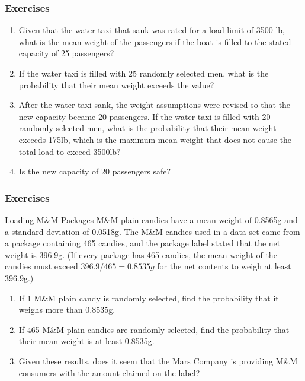 \documentclass[xcolor=dvipsnames]{beamer}
\begin{document}
\begin{frame}
  \frametitle{Exercises}
  \begin{enumerate}
  \item Given that the water taxi that sank was rated for a load
    limit of 3500 lb, what is the mean weight of the passengers if the
    boat is filled to the stated capacity of 25 passengers?
  \item If the water taxi is filled with 25 randomly selected men,
    what is the probability that their mean weight exceeds the value?
  \item After the water taxi sank, the weight assumptions were
    revised so that the new capacity became 20 passengers. If the
    water taxi is filled with 20 randomly selected men, what is the
    probability that their mean weight exceeds 175lb, which is the
    maximum mean weight that does not cause the total load to exceed
    3500lb?
  \item Is the new capacity of 20 passengers safe?
  \end{enumerate}
\end{frame}

\begin{frame}
  \frametitle{Exercises}
  {\ubung} Loading M\&M Packages M\&M plain candies have a mean weight
  of 0.8565g and a standard deviation of 0.0518g. The M\&M candies
  used in a data set came from a package containing 465 candies, and
  the package label stated that the net weight is 396.9g. (If every
  package has 465 candies, the mean weight of the candies must exceed
  $396.9/465=0.8535g$ for the net contents to weigh at least 396.9g.)
  \begin{enumerate}
  \item If 1 M\&M plain candy is randomly selected, find the
    probability that it weighs more than 0.8535g.
  \item If 465 M\&M plain candies are randomly selected, find the
    probability that their mean weight is at least 0.8535g.
  \item Given these results, does it seem that the Mars Company is
    providing M\&M consumers with the amount claimed on the label?
  \end{enumerate}
\end{frame}
\end{document}
